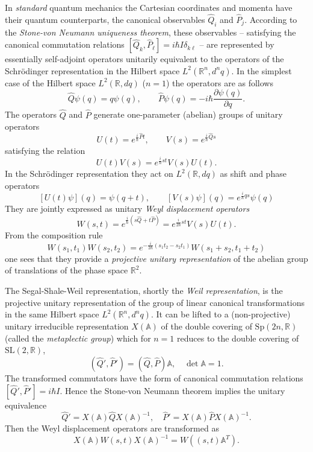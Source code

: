 \documentclass[10pt]{amsart}
\theoremstyle{plain}
\theoremstyle{definition}
\theoremstyle{remark}%
\newcommand{\SL}{\mathrm{SL}}
\newcommand{\Sp}{\mathrm{Sp}}
\begin{document}
In \textit{standard} quantum mechanics the Cartesian coordinates and momenta have
their quantum counterparts, the canonical observables $\hat{Q}_i$ and
$\hat{P}_j$. According to the \textit{Stone-von Neumann uniqueness theorem}, 
these observables -- satisfying the canonical commutation relations
$[\hat{Q}_k,\hat{P}_\ell]=i\hbar I \delta_{k\ell}$ --
are represented by essentially self-adjoint operators unitarily
equivalent to the operators of the Schr\"odinger representation in
the Hilbert space $L^2(\mathbb{R}^n,d^{n}q)$.
In the simplest case of the Hilbert space   $L^2(\mathbb{R}, dq)$ 
($n=1$) the operators are as follows
$$ \hat{Q}\psi(q)=q\psi(q), \qquad
\hat{P}\psi(q)=-i\hbar \frac{\partial\psi(q)}{\partial q}.$$
The operators $\hat{Q}$ and $\hat{P}$ generate one-parameter (abelian) groups
of unitary operators
$$ U(t)= e^{\frac{i}{\hbar} \hat{P} t }, \qquad
V(s) = e^{\frac{i}{\hbar} \hat{Q} s }
$$
satisfying the relation
$$ U(t)V(s)= e^{\frac{i}{\hbar}st} V(s)U(t). $$
In the Schr\"odinger representation
they act on $L^2(\mathbb{R}, dq)$ as shift and phase operators 
$$
[U(t)\psi](q) = \psi (q+t), \qquad
[V(s)\psi](q) =e^{\frac{i}{\hbar}qs} \psi(q)
$$
They are jointly expressed as unitary \textit{Weyl displacement operators} 
\begin{equation}  \label{W}
W(s,t) = e^{\frac{i}{\hbar}(s\hat{Q} + t\hat{P})} =
e^{\frac{i}{2\hbar}st} V(s)U(t).
\end{equation}
From the composition rule
\begin{equation}\label{composition}
W(s_1,t_1)W(s_2,t_2) = e^{-\frac{i}{2\hbar}(s_1 t_2 - s_2 t_1)}
W(s_1 + s_2, t_1 + t_2)
\end{equation}
one sees that they provide a \textit{projective unitary representation}
of the abelian group of translations of the phase space $\mathbb{R}^{2}$. 



The Segal-Shale-Weil representation, shortly the \textit{Weil
representation}, is the projective unitary representation of the group
of linear canonical transformations in the same Hilbert space
$L^2(\mathbb{R}^n,d^{n}q)$. It can be lifted to a (non-projective) unitary irreducible
representation $X(\mathbb{A})$ of the double covering of
$\Sp(2n,\mathbb{R})$ (called the \textit{metaplectic group}) which
for $n=1$ reduces to the double covering of $\SL(2,\mathbb{R})$,
\begin{equation}
(\hat{Q}',\hat{P}') =(\hat{Q},\hat{P})\mathbb{A}, \quad
\det{\mathbb{A}}=1.
\end{equation}
The transformed commutators have the form of canonical commutation
relations $[\hat{Q}',\hat{P}']=i\hbar I$. Hence 
the Stone-von Neumann theorem implies the unitary equivalence
$$ \hat{Q}' = X(\mathbb{A})\hat{Q}X(\mathbb{A})^{-1}, \quad
\hat{P}' = X(\mathbb{A})\hat{P}X(\mathbb{A})^{-1}.
$$
Then the Weyl displacement operators are transformed as
$$ X(\mathbb{A})W(s,t)X(\mathbb{A})^{-1}=W((s,t)\mathbb{A}^T).
$$
\end{document}
